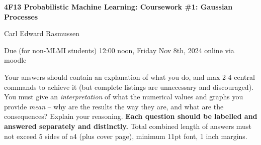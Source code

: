 \documentclass[12pt]{article}
\begin{document}
\centerline{\large\bf 4F13 Probabilistic Machine Learning: Coursework \#1: Gaussian Processes}

\vspace{0.3cm}

\centerline{Carl Edward Rasmussen} 

\vspace{0.2cm}

\centerline{Due (for non-MLMI students) 12:00 noon, Friday Nov 8th, 2024 online via moodle}

\vspace{2mm}

Your answers should contain an explanation of what you do, and max 2-4
central commands to achieve it (but complete listings are unnecessary
and discouraged). You must give an \emph{interpretation} of what the
numerical values and graphs you provide \emph{mean} -- why are the
results the way they are, and what are the consequences? Explain your
reasoning. {\bf Each question should be labelled and answered
  separately and distinctly.} Total combined length of answers must
not exceed 5 sides of a4 (plus cover page), minimum 11pt font, 1 inch
margins.
\end{document}
